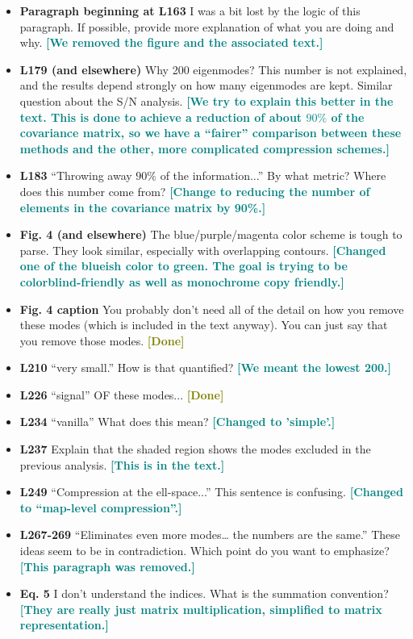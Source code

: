 \documentclass{article}
\newcommand\reply[1]{{\bf {\textcolor{teal}{[#1]}}}}
\newcommand\done{{\bf {\textcolor{olive}{[Done]}}}}
\begin{document}
\begin{itemize}
	\item \textbf{Paragraph beginning at L163} I was a bit lost by the logic of this paragraph. If possible, provide more explanation of what you are doing and why. \reply{We removed the figure and the associated text.}
	\item \textbf{L179 (and elsewhere)} Why 200 eigenmodes? This number is not explained, and the results depend strongly on how many eigenmodes are kept. Similar question about the S/N analysis. \reply{We try to explain this better in the text. This is done to achieve a reduction of about $90\%$ of the covariance matrix, so we have a “fairer” comparison between these methods and the other, more complicated compression schemes.}
	\item \textbf{L183} “Throwing away $90\%$ of the information...” By what metric? Where does this number come from? \reply{Change to reducing the number of elements in the covariance matrix by 90\%.}
	\item \textbf{Fig. 4 (and elsewhere)} The blue/purple/magenta color scheme is tough to parse. They look similar, especially with overlapping contours. \reply{Changed one of the blueish color to green. The goal is trying to be colorblind-friendly as well as monochrome copy friendly.}
	\item \textbf{Fig. 4 caption} You probably don’t need all of the detail on how you remove these modes (which is included in the text anyway). You can just say that you remove those modes. \done
	\item \textbf{L210} “very small.” How is that quantified? \reply{We meant the lowest 200.}
	\item \textbf{L226} “signal” OF these modes... \done
	\item \textbf{L234} “vanilla” What does this mean? \reply{Changed to 'simple'.}
	\item \textbf{L237} Explain that the shaded region shows the modes excluded in the previous analysis. \reply{This is in the text.}
	\item \textbf{L249} “Compression at the ell-space...” This sentence is confusing. \reply{Changed to “map-level compression”.}
	\item \textbf{L267-269} “Eliminates even more modes… the numbers are the same.” These ideas seem to be in contradiction. Which point do you want to emphasize? \reply{This paragraph was removed.}
	\item \textbf{Eq. 5} I don’t understand the indices. What is the summation convention? \reply{They are really just matrix multiplication, simplified to matrix representation.}

\end{itemize}
\end{document}
